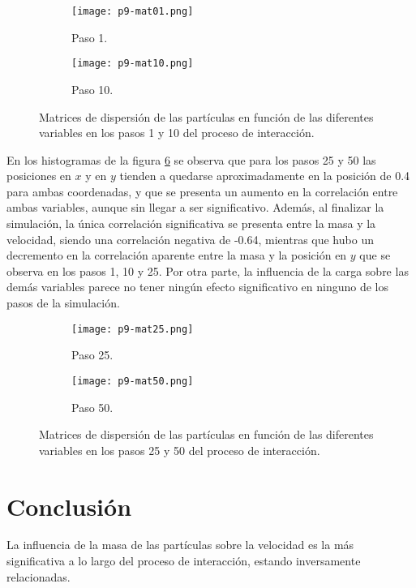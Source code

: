 \documentclass{article}
\begin{document}
\begin{figure}
\centering
\begin{subfigure}[b]{0.7\linewidth}
\texttt{[image: p9-mat01.png]}
\caption{Paso 1.}
\label{5}
\end{subfigure}
\begin{subfigure}[b]{0.7\linewidth}
\texttt{[image: p9-mat10.png]}
\caption{Paso 10.}
\label{6}
\end{subfigure}
\caption{Matrices de dispersión de las partículas en función de las diferentes variables en los pasos 1 y 10 del proceso de interacción.}
\label{matriz}
\end{figure}

En los histogramas de la figura \ref{matriz2} se observa que para los pasos 25 y 50 las posiciones en $x$ y en $y$ tienden a quedarse aproximadamente en la posición de 0.4 para ambas coordenadas, y que se presenta un aumento en la correlación entre ambas variables, aunque sin llegar a ser significativo. Además, al finalizar la simulación, la única correlación significativa se presenta entre la masa y la velocidad, siendo una correlación negativa de -0.64, mientras que hubo un decremento en la correlación aparente entre la masa y la posición en $y$ que se observa en los pasos 1, 10 y 25. Por otra parte, la influencia de la carga sobre las demás variables parece no tener ningún efecto significativo en ninguno de los pasos de la simulación. 

\begin{figure}
\centering
\begin{subfigure}[b]{0.7\linewidth}
\texttt{[image: p9-mat25.png]}
\caption{Paso 25.}
\label{7}
\end{subfigure}
\begin{subfigure}[b]{0.7\linewidth}
\texttt{[image: p9-mat50.png]}
\caption{Paso 50.}
\label{8}
\end{subfigure}
\caption{Matrices de dispersión de las partículas en función de las diferentes variables en los pasos 25 y 50 del proceso de interacción.}
\label{matriz2}
\end{figure}

\section{Conclusión}
La influencia de la masa de las partículas sobre la velocidad es la más significativa a lo largo del proceso de interacción, estando inversamente relacionadas. 



\end{document}
